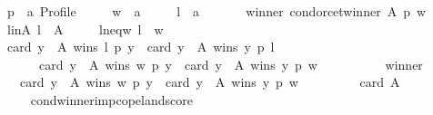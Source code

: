\begin{isabellebody}
\ \ \ \ p\ {\isacharcolon}{\kern0pt}{\isacharcolon}{\kern0pt}\ {\isachardoublequoteopen}{\isacharprime}{\kern0pt}a\ Profile{\isachardoublequoteclose}\ \isanewline
\ \ \ \ w\ {\isacharcolon}{\kern0pt}{\isacharcolon}{\kern0pt}\ {\isachardoublequoteopen}{\isacharprime}{\kern0pt}a{\isachardoublequoteclose}\ \isanewline
\ \ \ \ l\ {\isacharcolon}{\kern0pt}{\isacharcolon}{\kern0pt}\ {\isachardoublequoteopen}{\isacharprime}{\kern0pt}a{\isachardoublequoteclose}\isanewline
\ \ \isamarkupfalse%
\isanewline
\ \ \ \ winner{\isacharcolon}{\kern0pt}\ {\isachardoublequoteopen}condorcet{\isacharunderscore}{\kern0pt}winner\ A\ p\ w{\isachardoublequoteclose}\ \isanewline
\ \ \ \ l{\isacharunderscore}{\kern0pt}in{\isacharunderscore}{\kern0pt}A{\isacharcolon}{\kern0pt}\ {\isachardoublequoteopen}l\ {\isasymin}\ A{\isachardoublequoteclose}\ \isanewline
\ \ \ \ l{\isacharunderscore}{\kern0pt}neq{\isacharunderscore}{\kern0pt}w{\isacharcolon}{\kern0pt}\ {\isachardoublequoteopen}l\ {\isasymnoteq}\ w{\isachardoublequoteclose}\isanewline
\ \ \isamarkupfalse%
\isanewline
\ \ \ \ {\isachardoublequoteopen}card\ {\isacharbraceleft}{\kern0pt}y\ {\isasymin}\ A{\isachardot}{\kern0pt}\ wins\ l\ p\ y{\isacharbraceright}{\kern0pt}\ {\isacharminus}{\kern0pt}\ card\ {\isacharbraceleft}{\kern0pt}y\ {\isasymin}\ A{\isachardot}{\kern0pt}\ wins\ y\ p\ l{\isacharbraceright}{\kern0pt}\isanewline
\ \ \ \ \ \ \ \ {\isacharless}{\kern0pt}\ card\ {\isacharbraceleft}{\kern0pt}y\ {\isasymin}\ A{\isachardot}{\kern0pt}\ wins\ w\ p\ y{\isacharbraceright}{\kern0pt}\ {\isacharminus}{\kern0pt}\ card\ {\isacharbraceleft}{\kern0pt}y\ {\isasymin}\ A{\isachardot}{\kern0pt}\ wins\ y\ p\ w{\isacharbraceright}{\kern0pt}{\isachardoublequoteclose}\isanewline
\ \ \isamarkupfalse%
\ {\isacharminus}{\kern0pt}\isanewline
\ \ \ \ \isamarkupfalse%
\ winner\ \isamarkupfalse%
\ {}{\isacharcolon}{\kern0pt}\isanewline
\ \ \ \ \ \ {\isachardoublequoteopen}card\ {\isacharbraceleft}{\kern0pt}y\ {\isasymin}\ A{\isachardot}{\kern0pt}\ wins\ w\ p\ y{\isacharbraceright}{\kern0pt}\ {\isacharminus}{\kern0pt}\ card\ {\isacharbraceleft}{\kern0pt}y\ {\isasymin}\ A{\isachardot}{\kern0pt}\ wins\ y\ p\ w{\isacharbraceright}{\kern0pt}\ {\isacharequal}{\kern0pt}\isanewline
\ \ \ \ \ \ \ \ card\ A\ {\isacharminus}{\kern0pt}{}{\isachardoublequoteclose}\isanewline
\ \ \ \ \ \ \isamarkupfalse%
\ cond{\isacharunderscore}{\kern0pt}winner{\isacharunderscore}{\kern0pt}imp{\isacharunderscore}{\kern0pt}copeland{\isacharunderscore}{\kern0pt}score\isanewline

\end{isabellebody}
